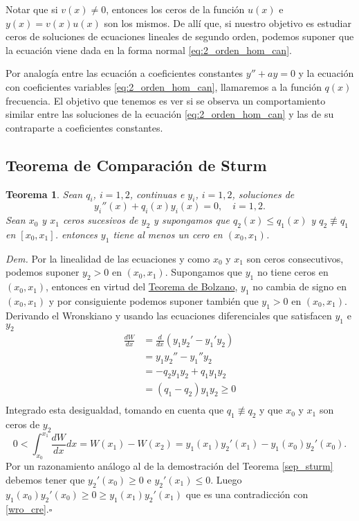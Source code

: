 \documentclass{article}
\newenvironment{demo}{\noindent\emph{Dem.}}{{\hspace*{\fill}$\square$} \newline\vspace{5pt}}
\newtheorem{teorema}{Teorema}[section]
\begin{document}
Notar que si $v(x)\neq 0$, entonces los ceros de la función $u(x)$ e $y(x)=v(x)u(x)$ son los mismos. De allí que, si nuestro objetivo es estudiar ceros de soluciones de ecuaciones lineales de segundo orden, podemos suponer que la ecuación viene dada en la forma normal  \eqref{eq:2_orden_hom_can}.

Por  analogía  entre las ecuación a coeficientes constantes $y''+ay=0$ y la ecuación con coeficientes variables \eqref{eq:2_orden_hom_can}, llamaremos a la función $q(x)$ frecuencia. El objetivo que tenemos es ver si se observa un comportamiento similar entre las soluciones de la ecuación  \eqref{eq:2_orden_hom_can} y las de su contraparte a coeficientes constantes. 

\subsection{Teorema de Comparación de Sturm}

\begin{teorema} Sean $q_i$, $i=1,2$,  continuas e  $y_i$, $i=1,2$, soluciones de
\[ y_i''(x)+q_i(x)y_i(x)=0,\quad i=1,2.\]
Sean $x_0$ y $x_1$ ceros sucesivos de $y_2$ y supongamos que $q_2(x)\leq q_1(x)$ y $q_2\not\equiv q_1$ en $[x_0,x_1]$. entonces $y_1$ tiene al menos un cero en $(x_0,x_1)$. 
\end{teorema}
\begin{demo} Por la linealidad de las ecuaciones y como $x_0$ y $x_1$ son ceros consecutivos, podemos suponer $y_2>0$ en $(x_0,x_1)$. Supongamos que $y_1$ no tiene ceros en $(x_0,x_1)$, entonces en virtud del \href{http://es.wikipedia.org/wiki/Teorema_del_valor_intermedio}{Teorema de Bolzano}, $y_1$ no cambia de signo en $(x_0,x_1)$ y por consiguiente podemos suponer también que $y_1>0$ en $(x_0,x_1)$. Derivando el Wronskiano y usando las ecuaciones diferenciales que satisfacen $y_1$ e $y_2$ 
\[\begin{split}
\frac{dW}{dx} &= \frac{d}{dx} (y_1y_2'-y_1'y_2)\\
&=y_1y_2''-y_1''y_2\\
&=-q_2y_1y_2+q_1y_1y_2\\
&=(q_1-q_2)y_1y_2\geq 0\\
\end{split}
\]
Integrado esta desigualdad, tomando en cuenta que $q_1\not\equiv q_2$ y que $x_0$ y $x_1$ son ceros de $y_2$
\begin{equation}\label{wro_cre}0<\int_{x_0}^{x_1}\frac{dW}{dx}dx=W(x_1)-W(x_2)=y_1(x_1)y_2'(x_1)-y_1(x_0)y_2'(x_0).
\end{equation}
Por un razonamiento análogo al de la demostración del Teorema \ref{sep_sturm} debemos tener que $y_2'(x_0)\geq 0$ e $y_2'(x_1)\leq 0$. Luego $y_1(x_0)y_2'(x_0)\geq 0\geq y_1(x_1)y_2'(x_1)$ que es una contradicción con \eqref{wro_cre}.\end{demo}
\end{document}
